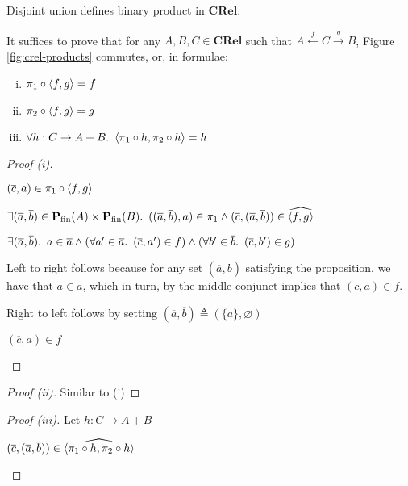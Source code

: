 \begin{prop}
  Disjoint union defines binary product in $\mathbf{CRel}$.

  It suffices to prove that for any $A,B,C\in\mathbf{CRel}$ such that ${A\overset{f}\longleftarrow C\overset{g}\longrightarrow B}$, Figure \ref{fig:crel-products} commutes, or, in formulae:

  \begin{enumerate}[(i)]
    \item $\pi_1\circ\langle f, g\rangle = f$
    \item $\pi_2\circ\langle f, g\rangle = g$
    \item $\forall h : C\to A+B\ldotp~\langle\pi_1\circ h,\pi_2\circ h\rangle = h$
  \end{enumerate}

  \begin{proof}[Proof (i)]
    \begin{itemize}
      \step
        $(\overline{c},a)\in\pi_1\circ\langle f,g\rangle$

      \step[\iffs]
        $\exists(\overline{a},\overline{b})\in\mathbf{P}_{\operatorname{fin}}(A)\times\mathbf{P}_{\operatorname{fin}}(B)\ldotp~((\overline{a},\overline{b}),a)\in\pi_1\land(\overline{c},(\overline{a},\overline{b}))\in\widehat{\langle f,g\rangle}$
        \marginnote{\Def-\ref{def:crel-comp}}

      \step[\iffs]
        $\exists(\overline{a},\overline{b})\ldotp~a\in\overline{a}\land(\forall a^\prime\in\overline{a}\ldotp~(\overline{c},a^\prime)\in f)\land(\forall b^\prime\in\overline{b}\ldotp~(\overline{c},b^\prime)\in g)$

      \step
        Left to right follows because for any set $(\overline{a},\overline{b})$ satisfying the proposition, we have that $a\in\overline{a}$, which in turn, by the middle conjunct implies that $(\overline{c},a)\in f$.

      \step
        Right to left follows by setting $(\overline{a},\overline{b})\triangleq(\{a\},\varnothing)$

      \step[\iffs]
        $(\overline{c},a)\in f$
        \qedhere
    \end{itemize}
  \end{proof}

  \begin{proof}[Proof (ii)]
    Similar to (i)\qedhere
  \end{proof}

  \begin{proof}[Proof (iii)]
    Let $h : C\to A+B$
    \begin{itemize}
      \step
        $(\overline{c}, (\overline{a}, \overline{b}))\in\widehat{\langle\pi_1\circ h,\pi_2\circ h\rangle}$


\end{itemize}
\end{proof}
\end{prop}
